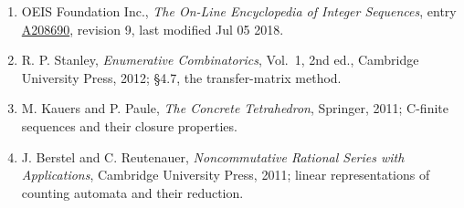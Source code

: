 \documentclass[11pt]{article}
\theoremstyle{definition}
\begin{document}
\begin{enumerate}

\item OEIS Foundation Inc., \emph{The On-Line Encyclopedia of Integer Sequences}, entry \href{https://oeis.org/A208690}{A208690}, revision 9, last modified Jul 05 2018.

\item R. P. Stanley, \emph{Enumerative Combinatorics}, Vol.~1, 2nd ed., Cambridge University Press, 2012; \S4.7, the transfer-matrix method.

\item M. Kauers and P. Paule, \emph{The Concrete Tetrahedron}, Springer, 2011; C-finite sequences and their closure properties.

\item J. Berstel and C. Reutenauer, \emph{Noncommutative Rational Series with Applications}, Cambridge University Press, 2011; linear representations of counting automata and their reduction.

\end{enumerate}
\end{document}
